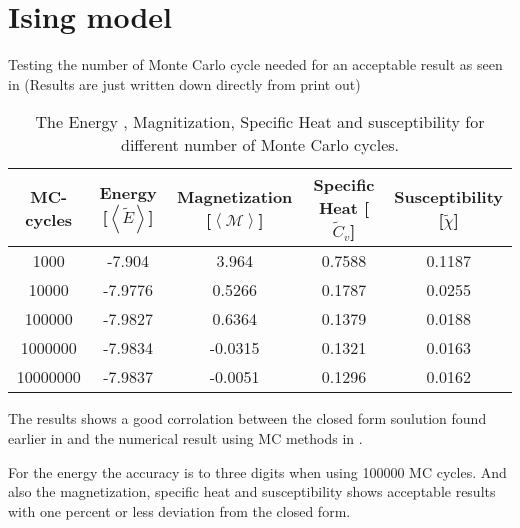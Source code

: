 \section{Ising model}
Testing the number of Monte Carlo cycle needed for an acceptable result as seen in  (Results are just written down directly from print out)

\begin{table}[H] 
\centering
\caption{The Energy , Magnitization, Specific Heat and susceptibility for different number of Monte Carlo cycles.}
\begin{center}
\begin{tabular}{|c|c|c|c|c|}
\hline
MC-cycles & Energy [$\left< \tilde{E} \right>$] & Magnetization [$\left< \mathcal{M} \right>$] & Specific Heat [$\tilde{C}_v $]& Susceptibility [$\tilde{\chi}$] \\
\hline
1000 & -7.904 & 3.964 & 0.7588 & 0.1187 \\
10000 & -7.9776 & 0.5266 & 0.1787 & 0.0255 \\
100000 & -7.9827 & 0.6364 & 0.1379 & 0.0188\\
1000000 & -7.9834 & -0.0315 & 0.1321 & 0.0163 \\
10000000 & -7.9837 & -0.0051 & 0.1296 & 0.0162 \\
\hline 

\end{tabular}
\end{center}
\label{tab:MCising}
\end{table}

The results shows a good corrolation between the closed form soulution found earlier in  and the numerical result using MC methods in . 

For the energy the accuracy is to three digits when using 100000 MC cycles. And also the magnetization, specific heat and susceptibility shows acceptable results with one percent or less deviation from the closed form. 
 